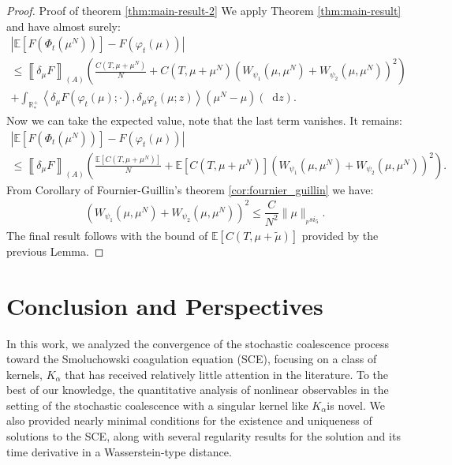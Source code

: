 \documentclass[11pt,a4paper]{article}
\newcommand{\RRP}{\mathbb{R}^+_*}
\newcommand{\A}{(A)}
\newcommand{\E}[1]{\mathbb{E}\left[#1\right]}
\newcommand{\dd}{\mathop{}\!\mathrm{d}}
\begin{document}
\begin{proof}{Proof of theorem \ref{thm:main-result-2}}
    We apply Theorem \ref{thm:main-result} and have almost surely:
    \begin{multline*}
        \left| \mathbb{E}\left[F\left(\Phi_t\left(\mu^N\right)\right)\right] - F\left(\varphi_t(\mu)\right) \right| \\
        \leq \left\llbracket \delta_\mu F \right\rrbracket_{\A} \left( \frac{C(T,\mu + \mu^N)}{N} + C(T,\mu + \mu^N)\left(W_{\psi_1}\left(\mu,\mu^N\right) + W_{\psi_2}\left(\mu,\mu^N\right) \right)^2\right) \\
        + \int_{\RRP} \left\langle \delta_\mu F\left(\varphi_t \left(\mu\right);\cdot \right), \delta_\mu \varphi_t\left(\mu;z \right) \right\rangle \left(\mu^N - \mu\right)(\dd z).
    \end{multline*}
    Now we can take the expected value, note that the last term vanishes. It remains:
    \begin{multline*}
         \left| \mathbb{E}\left[F\left(\Phi_t\left(\mu^N\right)\right)\right] - F\left(\varphi_t(\mu)\right) \right| \\
        \leq \left\llbracket \delta_\mu F \right\rrbracket_{\A} \left( \frac{\E{C(T,\mu + \mu^N)}}{N} + \E{C(T,\mu + \mu^N)}\left(W_{\psi_1}\left(\mu,\mu^N\right) + W_{\psi_2}\left(\mu,\mu^N\right) \right)^2\right).
    \end{multline*}
    From Corollary of Fournier-Guillin's theorem \ref{cor:fournier_guillin} we have:
    \begin{align*}
        \left(W_{\psi_1}\left(\mu,\mu^N\right) + W_{\psi_2}\left(\mu,\mu^N\right) \right)^2 \leq \dfrac{C}{N^2} \|\mu\|_{_psi_5}.
    \end{align*}
    The final result follows with the bound of $\E{C(T,\mu + \tilde{\mu})}$ provided by the previous Lemma.
\end{proof}

\section{Conclusion and Perspectives}

In this work, we analyzed the convergence of the stochastic coalescence process toward the Smoluchowski coagulation equation (SCE), focusing on a class of kernels, $K_\alpha$ that has received relatively little attention in the literature. To the best of our knowledge, the quantitative analysis of nonlinear observables in the setting of the stochastic coalescence with a singular kernel like $K_\alpha $is novel. We also provided nearly minimal conditions for the existence and uniqueness of solutions to the SCE, along with several regularity results for the solution and its time derivative in a Wasserstein-type distance.
\end{document}
